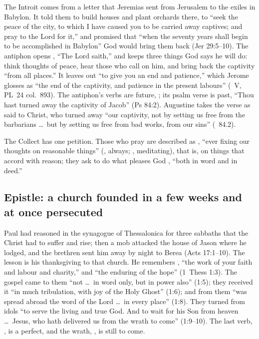 The Introit comes from a letter that Jeremias sent from Jerusalem to the
exiles in Babylon. It told them to build houses and plant orchards there, to
``seek the peace of the city, to which I have caused you to be carried away
captives; and pray to the Lord for it,'' and promised that ``when the seventy
years shall begin to be accomplished in Babylon'' God would bring them back
(Jer 29:5--10). The antiphon opens , ``The Lord saith,''
and keeps three things God says he will do: think thoughts of peace, hear
those who call on him, and bring back the captivity ``from all places.'' It
leaves out ``to give you an end and patience,'' which Jerome glosses as ``the
end of the captivity, and patience in the present labours'' (~V, PL~24 col.~893). The antiphon's verbs are future,
; its psalm verse is past,
``Thou hast turned away the captivity of Jacob'' (Ps 84:2). Augustine takes
the verse as said to Christ, who turned away ``our captivity, not by setting
us free from the barbarians \dots\ but by setting us free from bad works, from
our sins'' (~84.2).

The Collect has one petition. Those who pray are described as , ``ever fixing our thoughts on reasonable things''
(, always; , meditating), that is, on things
that accord with reason; they ask to do what pleases God , ``both in word and in deed.''

\subsection{Epistle: a church founded in a few weeks and at once persecuted}

Paul had reasoned in the synagogue of Thessalonica for three sabbaths that the
Christ had to suffer and rise; then a mob attacked the house of Jason where he
lodged, and the brethren sent him away by night to Berea (Acts 17:1--10). The lesson is his thanksgiving
to that church. He remembers , ``the work of your faith and labour and charity,'' and ``the
enduring of the hope'' (1~Thess 1:3). The gospel came to them ``not \dots\ in
word only, but in power also'' (1:5); they received it ``in much tribulation,
with joy of the Holy Ghost'' (1:6); and from them ``was spread abroad the word
of the Lord \dots\ in every place'' (1:8). They turned from idols ``to serve
the living and true God. And to wait for his Son from heaven \dots\ Jesus, who
hath delivered us from the wrath to come'' (1:9--10). The last verb,
, is a perfect, and the wrath, , is still to
come.

